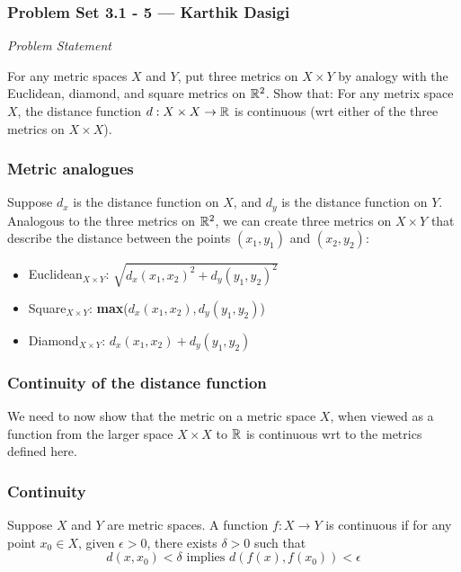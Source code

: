 
\begin{frame}
    \frametitle{Problem Set 3.1 - 5 --- Karthik Dasigi}
    \emph{Problem Statement}

    For any metric spaces \(X\) and \(Y\), put three metrics on \(X \times Y\)
    by analogy with the Euclidean, diamond, and square metrics on \(\mathbb{R}^2\).
    Show that: For any metrix space \(X\), the distance function \(d: X \times X
    \to \mathbb{R}\) is continuous (wrt either of the three metrics on \(X \times
    X\)).
\end{frame}

\begin{frame}
    \frametitle{Metric analogues}

    Suppose \(d_x\) is the distance function on \(X\), and \(d_y\) is the distance function on \(Y\).
    Analogous to the three metrics on \(\mathbb{R}^2\), we can create three metrics on \(X\times Y\) that
    describe the distance between the points \((x_1, y_1)\) and \((x_2, y_2)\):
    \begin{itemize}
        \item Euclidean\(_{X\times Y}\): \(\sqrt{d_x(x_1, x_2)^2 + d_y(y_1, y_2)^2}\)
        \item Square\(_{X\times Y}\): \textbf{max}(\(d_x(x_1, x_2) , d_y(y_1, y_2)\))
        \item Diamond\(_{X\times Y}\): \(d_x(x_1, x_2) + d_y(y_1, y_2)\)
    \end{itemize}

\end{frame}

\begin{frame}
    \frametitle{Continuity of the distance function}

    We need to now show that the metric on a metric space \(X\), when viewed as
    a function from the larger space \(X\times X\) to \(\mathbb{R}\) is continuous
    wrt to the metrics defined here. 

\end{frame}

\begin{frame}

    \frametitle{Continuity}

    \begin{definition}[Continuity]
        Suppose \(X\) and \(Y\) are metric spaces. A function \(f : X \rightarrow Y\)
        is continuous if for any point \(x_0 \in X\), given \(\epsilon > 0\),
        there exists \(\delta > 0\) such that
        \begin{equation}
            d(x,x_0)<\delta \text{ implies } d(f(x), f(x_0))<\epsilon 
        \end{equation}

    \end{definition}
    
\end{frame}

